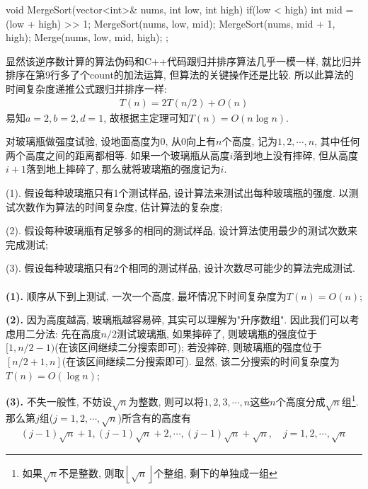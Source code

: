 \documentclass{article}
\begin{document}
\begin{homeworkProblem}
\begin{tcblisting}
{    void MergeSort(vector<int>& nums, int low, int high) {
        if(low < high) {
            int mid = (low + high) >> 1;
            MergeSort(nums, low, mid);
            MergeSort(nums, mid + 1, high);
            Merge(nums, low, mid, high);
        }
    }
};
\end{tcblisting}
显然该逆序数计算的算法伪码和C++代码跟归并排序算法几乎一模一样, 就比归并排序在第9行多了个count的加法运算, 但算法的关键操作还是比较. 所以此算法的时间复杂度递推公式跟归并排序一样:
\begin{align}
	T\left( n \right) =2T\left( n/2 \right) +O\left( n \right) 
\end{align}
易知$a=2,b=2,d=1$, 故根据主定理可知$T(n)=O(n\log n)$.
\end{homeworkProblem}

\begin{homeworkProblem}
	对玻璃瓶做强度试验, 设地面高度为0, 从0向上有$n$个高度, 记为$1,2,\cdots,n$, 其中任何两个高度之间的距离都相等. 如果一个玻璃瓶从高度$i$落到地上没有摔碎, 但从高度$i+1$落到地上摔碎了, 那么就将玻璃瓶的强度记为$i$.

	(1). 假设每种玻璃瓶只有1个测试样品, 设计算法来测试出每种玻璃瓶的强度. 以测试次数作为算法的时间复杂度, 估计算法的复杂度;

	(2). 假设每种玻璃瓶有足够多的相同的测试样品, 设计算法使用最少的测试次数来完成测试;

	(3). 假设每种玻璃瓶只有2个相同的测试样品, 设计次数尽可能少的算法完成测试.
	\\

	\solution
	\\

	\textbf{(1).} 顺序从下到上测试, 一次一个高度, 最坏情况下时间复杂度为$T(n)=O(n)$;

	\textbf{(2).} 因为高度越高, 玻璃瓶越容易碎, 其实可以理解为"升序数组". 因此我们可以考虑用二分法: 先在高度$n/2$测试玻璃瓶, 如果摔碎了, 则玻璃瓶的强度位于$[1,n/2-1)$(在该区间继续二分搜索即可); 若没摔碎, 则玻璃瓶的强度位于$[n/2+1,n]$(在该区间继续二分搜索即可). 显然, 该二分搜索的时间复杂度为$T(n)=O(\log n)$;
	
	\textbf{(3).} 不失一般性, 不妨设$\sqrt{n}$为整数, 则可以将$1,2,3,\cdots,n$这些$n$个高度分成$\sqrt{n}$组\footnote{如果$\sqrt{n}$不是整数, 则取$\left\lfloor \sqrt{n}\right\rfloor $个整组, 剩下的单独成一组}. 那么第$j$组($j=1,2,\cdots,\sqrt{n}$)所含有的高度有
	\begin{align}
		\left( j-1 \right) \sqrt{n}+1,\left( j-1 \right) \sqrt{n}+2,\cdots ,\left( j-1 \right) \sqrt{n}+\sqrt{n},\quad j=1,2,\cdots ,\sqrt{n}
	\end{align}


\end{homeworkProblem}
\end{document}
